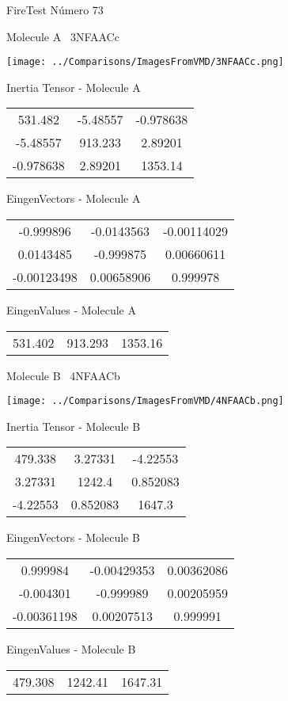 \vtab[-3cm]
\begin{center}
{\large FireTest \tab Número 73}
\end{center}
\begin{multicols}{2}
\begin{center}

Molecule A \
3NFAACc

\texttt{[image: ../Comparisons/ImagesFromVMD/3NFAACc.png]}

Inertia Tensor - Molecule A \\
\begin{tabular}{|c c c|}
531.482	 & 	-5.48557	 & 	-0.978638	 \\
-5.48557	 & 	913.233	 & 	2.89201	 \\
-0.978638	 & 	2.89201	 & 	1353.14
\end{tabular}

\vtab
 EingenVectors - Molecule A     \\
\begin{tabular}{|c c c|}
-0.999896	 & 	-0.0143563	 & 	-0.00114029	 \\
0.0143485	 & 	-0.999875	 & 	0.00660611	 \\
-0.00123498	 & 	0.00658906	 & 	0.999978
\end{tabular}

\vtab
 EingenValues - Molecule A     \\
\begin{tabular}{|c c c|}
531.402	 & 	913.293	 & 	1353.16	 \\
\end{tabular}
\columnbreak

Molecule B \
4NFAACb

\texttt{[image: ../Comparisons/ImagesFromVMD/4NFAACb.png]}

Inertia Tensor - Molecule B \\
\begin{tabular}{|c c c|}
479.338	 & 	3.27331	 & 	-4.22553	 \\
3.27331	 & 	1242.4	 & 	0.852083	 \\
-4.22553	 & 	0.852083	 & 	1647.3
\end{tabular}

\vtab
 EingenVectors - Molecule B     \\
\begin{tabular}{|c c c|}
0.999984	 & 	-0.00429353	 & 	0.00362086	 \\
-0.004301	 & 	-0.999989	 & 	0.00205959	 \\
-0.00361198	 & 	0.00207513	 & 	0.999991
\end{tabular}

\vtab
 EingenValues - Molecule B     \\
\begin{tabular}{|c c c|}
479.308	 & 	1242.41	 & 	1647.31	 \\
\end{tabular}

\end{center}
\end{multicols}

